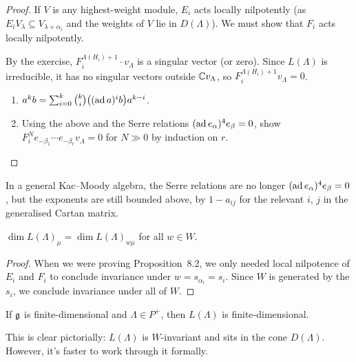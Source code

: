 \begin{proof}
If $V$ is any highest-weight module, $E_i$ acts locally nilpotently (as
$E_iV_\lambda \subseteq V_{\lambda+\alpha_i}$ and the weights of $V$ lie in
$D(\Lambda)$). We must show that $F_i$ acts locally nilpotently.

By the exercise, $F_i^{\Lambda(H_i)+1} \cdot v_\Lambda$ is a singular vector
(or zero). Since $L(\Lambda)$ is irreducible, it has no singular vectors
outside $\mathbb{C} v_\Lambda$, so $F_i^{\Lambda(H_i)+1}v_\Lambda = 0$.

\begin{exercise}\leavevmode
\begin{enumerate}
  \item $a^kb = \sum_{i=0}^k \binom{k}{i}\bigl((\operatorname{ad} a)^ib\bigr)a^{k-i}$.
  \item Using the above and the Serre relations $(\operatorname{ad} e_\alpha)^4e_\beta = 0$,
    show $F_i^Ne_{-\beta_1}\cdots e_{-\beta_r}v_\Lambda = 0$ for $N \gg 0$ by
    induction on $r$. \qedhere
\end{enumerate}
\end{exercise}
\end{proof}

\begin{remark}
In a general Kac--Moody algebra, the Serre relations are no longer
$(\operatorname{ad} e_\alpha)^4e_\beta = 0$, but the exponents are still bounded above, by
$1 - a_{ij}$ for the relevant $i$, $j$ in the generalised Cartan matrix.
\end{remark}

\begin{corollary}
$\dim L(\Lambda)_\mu = \dim L(\Lambda)_{w\mu}$ for all $w \in W$.
\end{corollary}

\begin{proof}
When we were proving Proposition~8.2, we only needed local nilpotence of $E_i$
and $F_i$ to conclude invariance under $w = s_{\alpha_i} = s_i$. Since $W$ is
generated by the $s_i$, we conclude invariance under all of $W$.
\end{proof}

\begin{theorem}
If $\mathfrak{g}$ is finite-dimensional and $\Lambda \in P^+$, then $L(\Lambda)$ is
finite-dimensional.
\end{theorem}

\begin{remark}
This is clear pictorially: $L(\Lambda)$ is $W$-invariant and sits in the cone
$D(\Lambda)$. However, it's faster to work through it formally.
\end{remark}


